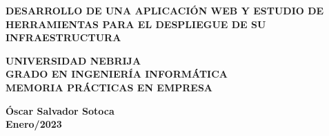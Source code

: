 \documentclass[11pt]{article}
\begin{document}
	\begin{titlepage}
		{\color{white}{.}}
		\linebreak
		\linebreak
		
		\centering
		\linebreak
		\vspace{3cm}
		
		{\LARGE\textbf{\color{RojoNebrija}DESARROLLO DE UNA APLICACIÓN WEB Y ESTUDIO DE HERRAMIENTAS PARA EL DESPLIEGUE DE SU INFRAESTRUCTURA}\par}
		\vspace{2cm}
		
		{\Large \textbf{\color{black}UNIVERSIDAD NEBRIJA \\ GRADO EN INGENIERÍA INFORMÁTICA \\ MEMORIA PRÁCTICAS EN EMPRESA}\par}
		\vspace{2cm}
		

		{\Large \textbf{ Óscar Salvador Sotoca\\ Enero/2023}\par}
		\vspace{2cm}

	\end{titlepage}
\end{document}
